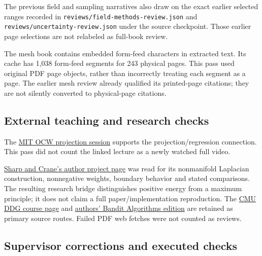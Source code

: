 The previous field and sampling narratives also draw on the exact earlier selected ranges recorded in \texttt{reviews/field-methods-review.json} and \texttt{reviews/uncertainty-review.json} under the source checkpoint. Those earlier page selections are not relabeled as full-book review.

The mesh book contains embedded form-feed characters in extracted text. Its cache has 1,038 form-feed segments for 243 physical pages. This pass used original PDF page objects, rather than incorrectly treating each segment as a page. The earlier mesh review already qualified its printed-page citations; they are not silently converted to physical-page citations.

\subsection{External teaching and research checks}\label{appendix-5056f3debc1f-external-teaching-and-research-checks}

The \href{https://www.ocw.mit.edu/courses/18-06sc-linear-algebra-fall-2011/pages/least-squares-determinants-and-eigenvalues/projection-matrices-and-least-squares/}{MIT OCW projection session} supports the projection/regression connection. This pass did not count the linked lecture as a newly watched full video.

\href{https://www.cs.cmu.edu/~kmcrane/Projects/NonmanifoldLaplace/index.html}{Sharp and Crane's author project page} was read for its nonmanifold Laplacian construction, nonnegative weights, boundary behavior and stated comparisons. The resulting research bridge distinguishes positive energy from a maximum principle; it does not claim a full paper/implementation reproduction. The \href{https://www.cs.cmu.edu/~kmcrane/Projects/DGPDEC/index.html}{CMU DDG course page} and \href{https://tor-lattimore.com/downloads/book/book.pdf}{authors' Bandit Algorithms edition} are retained as primary source routes. Failed PDF web fetches were not counted as reviews.

\subsection{Supervisor corrections and executed checks}\label{appendix-5056f3debc1f-supervisor-corrections-and-executed-checks}

